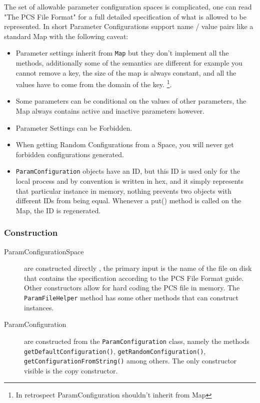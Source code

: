 \documentclass[11pt,letterpaper,oneside]{article}
\begin{document}
The set of allowable parameter configuration spaces is complicated, one can read "The PCS File Format" for a full detailed specification of what is allowed to be represented. In short Parameter Configurations support name / value pairs like a standard Map with the following caveat:

\begin{itemize}
\item Parameter settings inherit from \texttt{Map} but they don't implement all the methods, additionally some of the semantics are different for example you cannot remove a key, the size of the map is always constant, and all the values have to come from the domain of the key. \footnote{In retrospect ParamConfiguration shouldn't inherit from Map}.
\item Some parameters can be conditional on the values of other parameters, the Map always contains active and inactive parameters however.
\item Parameter Settings can be Forbidden.
\item When getting Random Configurations from a Space, you will never get forbidden configurations generated.
\item \texttt{ParamConfiguration} objects have an ID, but this ID is used only for the local process and by convention is written in hex, and it simply represents that particular instance in memory, nothing prevents two objects with different IDs from being equal. Whenever a put() method is called on the Map, the ID is regenerated. 

\end{itemize}

\subsubsection{Construction}
\begin{description}
\item[ParamConfigurationSpace] are constructed directly , the primary input is the name of the file on disk that contains the specification according to the PCS File Format guide. Other constructors allow for hard coding the PCS file in memory. The \texttt{ParamFileHelper} method has some other methods that can construct instances.
\item[ParamConfiguration] are constructed from the \texttt{ParamConfiguration} class, namely the methods \texttt{getDefaultConfiguration()}, \texttt{getRandomConfiguration()}, \texttt{getConfigurationFromString()} among others. The only constructor visible is the copy constructor.
\end{description}
\end{document}
